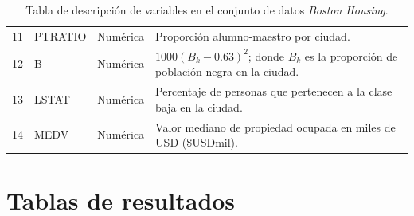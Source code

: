 \documentclass[11pt, letterpaper]{article}
\begin{document}
\begin{table}[h!]
\begin{adjustbox}{width=\textwidth}
\begin{tabular}{llll}
11          & PTRATIO            & {\color[HTML]{FE0000} Numérica}                  & Proporción alumno-maestro por ciudad.                                                 \\
12          & B                  & {\color[HTML]{FE0000} Numérica}                  & $1000(B_k - 0.63)^2$; donde $B_k$ es la proporción de población negra en   la ciudad. \\
13          & LSTAT              & {\color[HTML]{FE0000} Numérica}                  & Percentaje de personas que pertenecen a la clase baja en la ciudad.                   \\
14          & MEDV               & {\color[HTML]{FE0000} Numérica}                  & Valor mediano de propiedad ocupada en miles de USD (\$USDmil).                        \\ \hline
\end{tabular}
\end{adjustbox}
\caption{Tabla de descripción de variables en el conjunto de datos \textit{Boston Housing}.}
\label{tab:variables}
\end{table}

\section{Tablas de resultados}
\end{document}
